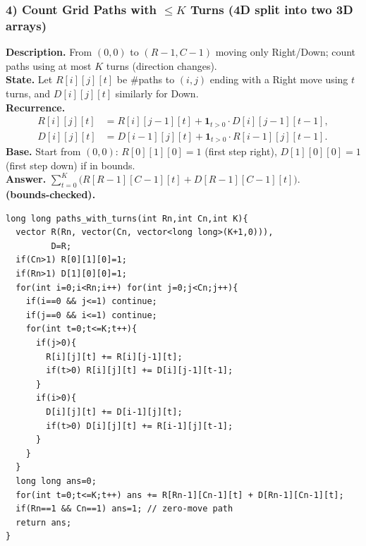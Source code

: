\documentclass[9pt]{extarticle}
\begin{document}
\subsubsection{4) Count Grid Paths with \(\le K\) Turns (4D split into two 3D arrays)}
\textbf{Description.} From \((0,0)\) to \((R-1,C-1)\) moving only Right/Down; count paths using at most \(K\) turns (direction changes).  \\
\textbf{State.} Let \(R[i][j][t]\) be \#paths to \((i,j)\) ending with a Right move using \(t\) turns, and \(D[i][j][t]\) similarly for Down.\\  
\textbf{Recurrence.}
\[
\begin{aligned}
R[i][j][t] &= R[i][j-1][t] + \mathbf{1}_{t>0}\cdot D[i][j-1][t-1],\\
D[i][j][t] &= D[i-1][j][t] + \mathbf{1}_{t>0}\cdot R[i-1][j][t-1].
\end{aligned}
\]
\textbf{Base.} Start from \((0,0)\): \(R[0][1][0]=1\) (first step right), \(D[1][0][0]=1\) (first step down) if in bounds.  \\
\textbf{Answer.} \(\sum_{t=0}^K \big(R[R-1][C-1][t]+D[R-1][C-1][t]\big)\).  \\
\textbf{(bounds-checked).}
\begin{verbatim}
long long paths_with_turns(int Rn,int Cn,int K){
  vector R(Rn, vector(Cn, vector<long long>(K+1,0))),
         D=R;
  if(Cn>1) R[0][1][0]=1;
  if(Rn>1) D[1][0][0]=1;
  for(int i=0;i<Rn;i++) for(int j=0;j<Cn;j++){
    if(i==0 && j<=1) continue;
    if(j==0 && i<=1) continue;
    for(int t=0;t<=K;t++){
      if(j>0){
        R[i][j][t] += R[i][j-1][t];
        if(t>0) R[i][j][t] += D[i][j-1][t-1];
      }
      if(i>0){
        D[i][j][t] += D[i-1][j][t];
        if(t>0) D[i][j][t] += R[i-1][j][t-1];
      }
    }
  }
  long long ans=0;
  for(int t=0;t<=K;t++) ans += R[Rn-1][Cn-1][t] + D[Rn-1][Cn-1][t];
  if(Rn==1 && Cn==1) ans=1; // zero-move path
  return ans;
}
\end{verbatim}

\end{document}
